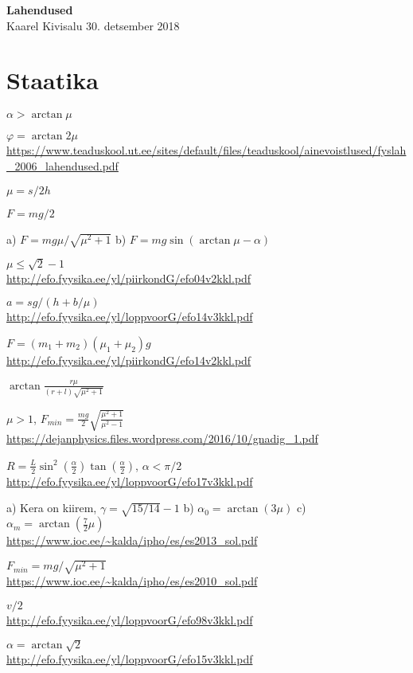 \documentclass[a4paper,11pt,twocolumn]{article}
\begin{document}
{\huge \textbf{Lahendused}} \\
{Kaarel Kivisalu \hfill 30. detsember 2018}

\section{Staatika}
\begin{solutions}
	\item \( \alpha>\arctan \mu \)
	\item \( \varphi=\arctan 2\mu \) \\ \url{https://www.teaduskool.ut.ee/sites/default/files/teaduskool/ainevoistlused/fyslah_2006_lahendused.pdf}
	\item \( \mu=s/2h \)
	\item \( F=mg/2 \)
	\item a) \( F=mg\mu/\sqrt{\mu^2+1} \) b) \( F=mg \sin (\arctan \mu -\alpha) \)
	\item \( \mu \le \sqrt{2}-1 \) \\ \url{http://efo.fyysika.ee/yl/piirkondG/efo04v2kkl.pdf}
	\item
	\item \( a=sg/(h+b/\mu) \) \\ \url{http://efo.fyysika.ee/yl/loppvoorG/efo14v3kkl.pdf}
	\item \( F=(m_1+m_2)(\mu_1+\mu_2)g \) \\ \url{http://efo.fyysika.ee/yl/piirkondG/efo14v2kkl.pdf}
	\item \( \arctan \frac{r\mu}{(r+l)\sqrt{\mu^2+1}} \)
	\item \( \mu > 1 \), \( F_{min}=\frac{mg}{2} \sqrt{\frac{\mu^2+1}{\mu^2-1}} \) \\
	\url{https://dejanphysics.files.wordpress.com/2016/10/gnadig_1.pdf}
	\item \( R=\frac{L}{2}\sin^2(\frac{\alpha}{2})\tan(\frac{\alpha}{2}) \), \( \alpha < \pi/2 \)\\ \url{http://efo.fyysika.ee/yl/loppvoorG/efo17v3kkl.pdf}
	\item a) Kera on kiirem, \( \gamma=\sqrt{15/14}-1 \) b) \( \alpha_0=\arctan(3\mu) \) c) \( \alpha_m=\arctan(\frac{7}{2}\mu) \)  \\ \url{https://www.ioc.ee/~kalda/ipho/es/es2013_sol.pdf}
	\item \( F_{min}={mg}/{\sqrt{\mu^2+1}} \) \\ \url{https://www.ioc.ee/~kalda/ipho/es/es2010_sol.pdf}
	\item \( v/2 \) \\ \url{http://efo.fyysika.ee/yl/loppvoorG/efo98v3kkl.pdf}
	\item \( \alpha=\arctan\sqrt{2} \)\\ \url{http://efo.fyysika.ee/yl/loppvoorG/efo15v3kkl.pdf}
\end{solutions}
\end{document}
